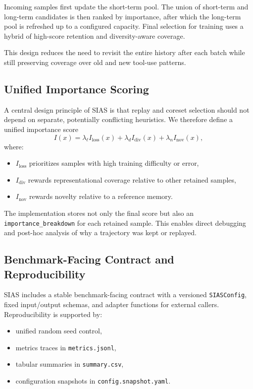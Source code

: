 \documentclass{article}
\begin{document}
Incoming samples first update the short-term pool. The union of short-term and long-term candidates is then ranked by importance, after which the long-term pool is refreshed up to a configured capacity. Final selection for training uses a hybrid of high-score retention and diversity-aware coverage.

This design reduces the need to revisit the entire history after each batch while still preserving coverage over old and new tool-use patterns.

\subsection{Unified Importance Scoring}

A central design principle of SIAS is that replay and coreset selection should not depend on separate, potentially conflicting heuristics. We therefore define a unified importance score
\[
I(x) = \lambda_{\ell} I_{\text{loss}}(x) + \lambda_{d} I_{\text{div}}(x) + \lambda_{n} I_{\text{nov}}(x),
\]
where:
\begin{itemize}[leftmargin=12pt]
    \item $I_{\text{loss}}$ prioritizes samples with high training difficulty or error,
    \item $I_{\text{div}}$ rewards representational coverage relative to other retained samples,
    \item $I_{\text{nov}}$ rewards novelty relative to a reference memory.
\end{itemize}

The implementation stores not only the final score but also an \texttt{importance\_breakdown} for each retained sample. This enables direct debugging and post-hoc analysis of why a trajectory was kept or replayed.

\subsection{Benchmark-Facing Contract and Reproducibility}

SIAS includes a stable benchmark-facing contract with a versioned \texttt{SIASConfig}, fixed input/output schemas, and adapter functions for external callers. Reproducibility is supported by:
\begin{itemize}[leftmargin=12pt]
    \item unified random seed control,
    \item metrics traces in \texttt{metrics.jsonl},
    \item tabular summaries in \texttt{summary.csv},
    \item configuration snapshots in \texttt{config.snapshot.yaml}.
\end{itemize}
\end{document}
